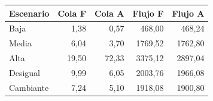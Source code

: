 \begin{tabular}{lrrrr}\toprule
Escenario & Cola F & Cola A & Flujo F & Flujo A\\\midrule
Baja & 1,38 & 0,57 & 468,00 & 468,24\\
Media & 6,04 & 3,70 & 1769,52 & 1762,80\\
Alta & 19,50 & 72,33 & 3375,12 & 2897,04\\
Desigual & 9,99 & 6,05 & 2003,76 & 1966,08\\
Cambiante & 7,24 & 5,10 & 1918,08 & 1900,80\\
\bottomrule\end{tabular}
